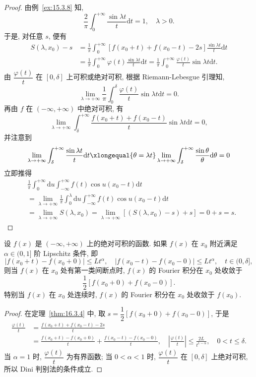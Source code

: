\begin{proof}
由例~\ref{ex:15.3.8} 知,
\[
  \frac{2}{\pi}\int_{0}^{+\infty}\frac{\sin\lambda t}{t}\mathrm{d}t=1,\quad\lambda>0.
\]
于是, 对任意 $s$, 便有
\begin{align*}
  S(\lambda,x_{0})-s&=\frac{1}{\pi}\int_{0}^{+\infty}\left[f(x_{0}+t)+f(x_{0}-t)-2s\right]\frac{\sin\lambda t}{t}\mathrm{d}t\\
  &=\frac{1}{\pi}\int_{0}^{+\infty}\varphi(t)\frac{\sin\lambda t}{t}\mathrm{d}t=\frac{1}{\pi}\int_{0}^{+\infty}\frac{\varphi(t)}{t}\sin\lambda t\mathrm{d}t.
\end{align*}
由 $\dfrac{\varphi(t)}{t}$ 在 $[0,\delta]$ 上可积或绝对可积, 根据 Riemann-Lebesgue 引理知,
\[
  \lim_{\lambda\to+\infty}\frac{1}{\pi}\int_{0}^{\delta}\frac{\varphi(t)}{t}\sin\lambda t\mathrm{d}t=0.
\]
再由 $f$ 在 $(-\infty,+\infty)$ 中绝对可积, 有
\[
  \lim_{\lambda\to+\infty}\int_{\delta}^{+\infty}\frac{f(x_{0}+t)+f(x_{0}-t)}{t}\sin\lambda t\mathrm{d}t=0,
\]
并注意到
\[
  \lim_{\lambda\to+\infty}\int_{\delta}^{+\infty}\frac{\sin\lambda t}{t}\mathrm{d}t\xlongequal{\theta=\lambda t}\lim_{\lambda\to+\infty}\int_{\delta}^{+\infty}\frac{\sin\theta}{\theta}\mathrm{d}\theta=0
\]
立即推得
\begin{align*}
  &\frac{1}{\pi}\int_{0}^{+\infty}\mathrm{d}u\int_{-\infty}^{+\infty}f(t)\cos u(x_{0}-t)\mathrm{d}t\\
  &=\lim_{\lambda\to+\infty}\frac{1}{\pi}\int_{0}^{\lambda}\mathrm{d}u\int_{-\infty}^{+\infty}f(t)\cos u(x_{0}-t)\mathrm{d}t\\
  &=\lim_{\lambda\to+\infty}S(\lambda,x_{0})=\lim_{\lambda\to+\infty}\left[(S(\lambda,x_{0})-s)+s\right]=0+s=s.
\end{align*}
\end{proof}

\begin{corollary}\label{cor:16.3.1}
设 $f(x)$ 是 $(-\infty,+\infty)$ 上的绝对可积的函数. 如果 $f(x)$ 在 $x_{0}$ 附近满足 $\alpha\in(0,1]$ 阶 Lipschitz 条件, 即
\[
  |f(x_{0}+t)-f(x_{0}+0)|\leqslant Lt^{\alpha},\quad|f(x_{0}-t)-f(x_{0}-0)|\leqslant Lt^{\alpha},\quad t\in(0,\delta],
\]
则当 $f(x)$ 在 $x_{0}$ 处有第一类间断点时, $f(x)$ 的 Fourier 积分在 $x_{0}$ 处收敛于
\[
  \frac{1}{2}[f(x_{0}+0)+f(x_{0}-0)].
\]
特别当 $f(x)$ 在 $x_{0}$ 处连续时, $f(x)$ 的 Fourier 积分在 $x_{0}$ 处收敛于 $f(x_{0})$.
\end{corollary}

\begin{proof}
在定理~\ref{thm:16.3.4} 中, 取 $s=\dfrac{1}{2}[f(x_{0}+0)+f(x_{0}-0)]$, 于是
\begin{align*}
  \frac{\varphi(t)}{t}&=\frac{f(x_{0}+t)+f(x_{0}-t)-2s}{t}\\
  &=\frac{f(x_{0}+t)-f(x_{0}+0)}{t}+\frac{f(x_{0}-t)-f(x_{0}-0)}{t},\quad\left|\frac{\varphi(t)}{t}\right|\leqslant\frac{2L}{t^{1-\alpha}},\quad 0<t\leqslant\delta.
\end{align*}
当 $\alpha=1$ 时, $\dfrac{\varphi(t)}{t}$ 为有界函数; 当 $0<\alpha<1$ 时, $\dfrac{\varphi(t)}{t}$ 在 $[0,\delta]$ 上绝对可积, 所以 Dini 判别法的条件成立.
\end{proof}

